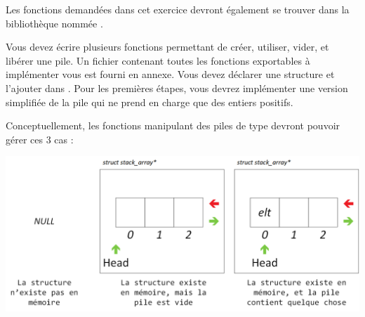

\vspace*{0.7cm}

\noindent {}

\bigskip

\noindent Les fonctions demandées dans cet exercice devront également se trouver dans la bibliothèque nommée .

\bigskip

\noindent Vous devez écrire plusieurs fonctions permettant de créer, utiliser, vider, et libérer une pile.
Un fichier  contenant toutes les fonctions exportables à implémenter vous est fourni en annexe.
Vous devez déclarer une structure  et l'ajouter dans .
Pour les premières étapes, vous devrez implémenter une version simplifiée de la pile qui ne prend en charge que des entiers positifs.


\bigskip

\noindent Conceptuellement, les fonctions manipulant des piles de type  devront pouvoir gérer ces 3 cas :

\bigskip

\begin{center}
\includegraphics[scale=0.85]{Cours/Piles_Implementation_ARRAY.png}
\end{center}

\bigskip

